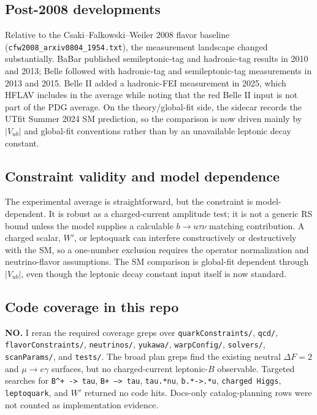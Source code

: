 \subsection*{Post-2008 developments}
Relative to the Csaki--Falkowski--Weiler 2008 flavor baseline
(\texttt{cfw2008\_arxiv0804\_1954.txt}), the measurement landscape changed
substantially.  BaBar published semileptonic-tag and hadronic-tag results in
2010 and 2013; Belle followed with hadronic-tag and semileptonic-tag
measurements in 2013 and 2015.  Belle II added a hadronic-FEI measurement in
2025, which HFLAV includes in the average while noting that the red Belle II
input is not part of the PDG average.  On the theory/global-fit side, the
sidecar records the UTfit Summer 2024 SM prediction, so the comparison is now
driven mainly by \(|V_{ub}|\) and global-fit conventions rather than by an
unavailable leptonic decay constant.

\subsection*{Constraint validity and model dependence}
The experimental average is straightforward, but the constraint is
model-dependent.  It is robust as a charged-current amplitude test; it is not a
generic RS bound unless the model supplies a calculable \(b\to u\tau\nu\)
matching contribution.  A charged scalar, \(W'\), or leptoquark can interfere
constructively or destructively with the SM, so a one-number exclusion requires
the operator normalization and neutrino-flavor assumptions.  The SM comparison
is global-fit dependent through \(|V_{ub}|\), even though the leptonic decay
constant input itself is now standard.

\subsection*{Code coverage in this repo}
\textbf{NO.}  I reran the required coverage greps over
\texttt{quarkConstraints/}, \texttt{qcd/}, \texttt{flavorConstraints/},
\texttt{neutrinos/}, \texttt{yukawa/}, \texttt{warpConfig/},
\texttt{solvers/}, \texttt{scanParams/}, and \texttt{tests/}.  The broad plan
greps find the existing neutral \(\Delta F=2\) and \(\mu\to e\gamma\) surfaces,
but no charged-current leptonic-\(B\) observable.  Targeted searches for
\texttt{B\string^+ -> tau}, \texttt{B+ --> tau}, \texttt{tau.*nu},
\texttt{b.*->.*u}, \texttt{charged Higgs}, \texttt{leptoquark}, and \(W'\)
returned no code hits.  Docs-only catalog-planning rows were not counted as
implementation evidence.


